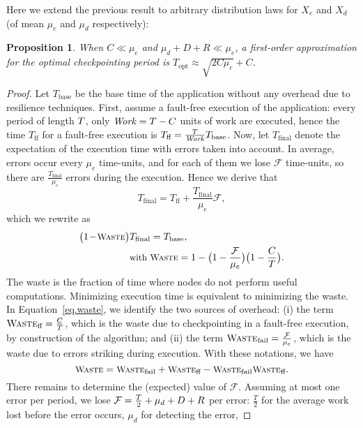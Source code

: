 \documentclass[10pt,table]{article}
\newtheorem{proposition}{Proposition}
\newcommand{\ema}[1]{\ensuremath{#1}\xspace}
\newcommand{\fail}{\mathcal{F}}
\newcommand{\mue}{\ema{\mu_{e}}}
\newcommand{\mud}{\ema{\mu_{d}}}
\newcommand{\ccc}{\ema{C}}
\newcommand{\rrr}{\ema{R}}
\newcommand{\ddd}{\ema{D}}
\newcommand{\Waste}{\ema{\textsc{Waste}}}
\newcommand{\Wasteff}{\ema{\textsc{Waste}_{\text{ff}}}}
\newcommand{\Wastefail}{\ema{\textsc{Waste}_{\text{fail}}}}
\newcommand{\tbase}{T_{\text{base}}}
\newcommand{\tff}{T_{\text{ff}}}
\newcommand{\tfin}{T_{\text{final}}}
\newcommand{\W}{\ensuremath{\mathit{Work}}\xspace}
\newcommand{\Topt}{\ema{T_{\text{opt}}}}
\begin{document}
Here we extend the previous result to arbitrary distribution laws for $X_{e}$ and $X_{d}$ (of mean \mue and \mud respectively):

\begin{proposition}
\label{th.work4}
When $\ccc \ll \mue$ and $\mud + D + R \ll \mue$, a first-order approximation 
for the optimal checkpointing period is 
$\Topt \approx \sqrt{2 \ccc \mue}+\ccc$.
\end{proposition}

\begin{proof}
Let $\tbase$ be the base time of the application without any overhead due
to resilience techniques.  First, assume a fault-free execution of the
application: every period of length $T$, only $\W = \T - \ccc$ units of work are executed, 
hence the time $\tff$ for a
fault-free execution is $\tff = \frac{\T}{\W} \tbase$.
Now, let $\tfin$ denote the expectation of the execution time with errors taken into account.  
In average, errors occur every $\mue$
time-units, and for each of them we lose $\fail$ time-units, so there
are $\frac{\tfin}{\mue}$ errors during the execution. Hence we
derive that 
\begin{equation}
\tfin = \tff  + \frac{\tfin}{\mue} \fail , 
\label{eq.tfinal}
\end{equation}
which we rewrite as
\begin{align}
\small
\big(  1\! -\! \Waste \big)& \tfin  = \tbase,\nonumber \\  
 & \small \text{with }
\Waste = 1 - \big(  1 -  \frac{\fail}{\mue} \big)   \big(  1 -  \frac{\ccc}{\T} \big)  .
\label{eq.waste}
\end{align}
The waste is the fraction of time where nodes do not perform useful
computations. Minimizing execution time is equivalent to minimizing the waste. 
In Equation~\eqref{eq.waste}, we identify the two
sources of overhead: (i) the term $\Wasteff = \frac{\ccc}{\T}$, which is the waste due to checkpointing in a fault-free
execution, by construction of the algorithm; and (ii) the term
$\Wastefail = \frac{\fail}{\mue}$, which is the waste due to
errors striking during execution.  With these notations, we have
\begin{equation}
\small
\Waste = \Wastefail  +\Wasteff  - \Wastefail  \Wasteff .
\label{eq.wasteprod}
\end{equation}
There remains to determine the (expected) value of $\fail$. 
Assuming at most one error per period, we lose 
$\fail = \frac{\T}{2}+\mud+\ddd+\rrr$ per error:
$\frac{T}{2}$ for the average work lost before the error occurs, \mud for detecting the error, 

\end{proof}
\end{document}
